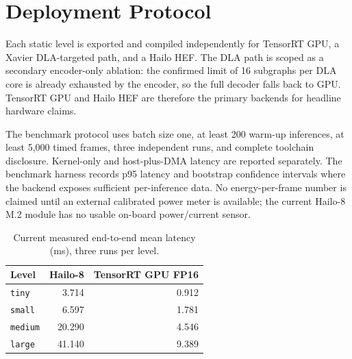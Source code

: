 \section{Deployment Protocol}
\label{sec:deployment}

Each static level is exported and compiled independently for TensorRT GPU, a Xavier DLA-targeted path, and a Hailo HEF. The DLA path is scoped as a secondary encoder-only ablation: the confirmed limit of 16 subgraphs per DLA core is already exhausted by the encoder, so the full decoder falls back to GPU. TensorRT GPU and Hailo HEF are therefore the primary backends for headline hardware claims.

The benchmark protocol uses batch size one, at least 200 warm-up inferences, at least 5,000 timed frames, three independent runs, and complete toolchain disclosure. Kernel-only and host-plus-DMA latency are reported separately. The benchmark harness records p95 latency and bootstrap confidence intervals where the backend exposes sufficient per-inference data. No energy-per-frame number is claimed until an external calibrated power meter is available; the current Hailo-8 M.2 module has no usable on-board power/current sensor.

\begin{table}[t]
\caption{Current measured end-to-end mean latency (ms), three runs per level.}
\label{tab:latency}
\centering
\begin{tabular}{lrr}
\toprule
Level & Hailo-8 & TensorRT GPU FP16 \\
\midrule
\texttt{tiny} & 3.714 & 0.912 \\
\texttt{small} & 6.597 & 1.781 \\
\texttt{medium} & 20.290 & 4.546 \\
\texttt{large} & 41.140 & 9.389 \\
\bottomrule
\end{tabular}
\end{table}

